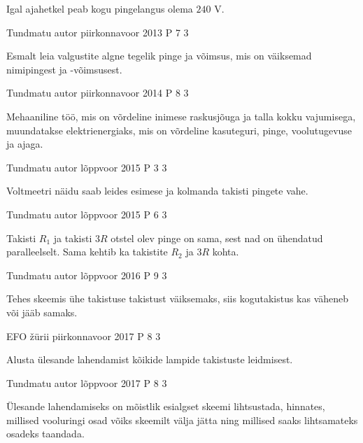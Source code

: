 \documentclass[11pt]{article}
\begin{document}
{{\ifHint
Igal ajahetkel peab kogu pingelangus olema $240$ V.
\fi
}

{Tundmatu autor} %
{piirkonnavoor} %
{2013} %
{P 7} %
{3} %
{

\ifHint
Esmalt leia valgustite algne tegelik pinge ja võimsus, mis on väiksemad nimipingest ja -võimsusest.
\fi
}

{Tundmatu autor} %
{piirkonnavoor} %
{2014} %
{P 8} %
{3} %
{

\ifHint
Mehaaniline töö, mis on võrdeline inimese raskusjõuga ja talla kokku vajumisega, muundatakse elektrienergiaks, mis on võrdeline kasuteguri, pinge, voolutugevuse ja ajaga.
\fi
}

{Tundmatu autor} %
{lõppvoor} %
{2015} %
{P 3} %
{3} %
{

\ifHint
Voltmeetri näidu saab leides esimese ja kolmanda takisti pingete vahe.
\fi
}

{Tundmatu autor} %
{lõppvoor} %
{2015} %
{P 6} %
{3} %
{

\ifHint
Takisti $R_1$ ja takisti $3R$ otstel olev pinge on sama, sest nad on ühendatud paralleelselt. Sama kehtib ka takistite $R_2$ ja $3R$ kohta.
\fi
}

{Tundmatu autor} %
{lõppvoor} %
{2016} %
{P 9} %
{3} %
{

\ifHint
Tehes skeemis ühe takistuse takistust väiksemaks, siis kogutakistus kas väheneb või jääb samaks.
\fi
}

{EFO žürii} %
{piirkonnavoor} %
{2017} %
{P 8} %
{3} %
{

\ifHint
Alusta ülesande lahendamist kõikide lampide takistuste leidmisest.
\fi
}

{Tundmatu autor} %
{lõppvoor} %
{2017} %
{P 8} %
{3} %
{

\ifHint
Ülesande lahendamiseks on mõistlik esialgset skeemi lihtsustada, hinnates, millised vooluringi osad võiks skeemilt välja jätta ning millised saaks lihtsamateks osadeks taandada.
\fi
}

}
\end{document}
